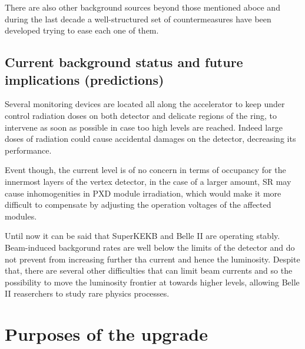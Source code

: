 There are also other  background sources beyond those mentioned aboce and during the last decade a well-structured set of countermeasures have been developed trying to ease each one of them.


\subsection{Current background status and future implications (predictions)}

Several monitoring devices are located all along the accelerator to keep under control radiation doses on both detector and delicate regions of the ring, to intervene as soon as possible in case too high levels are reached. Indeed large doses of radiation could cause accidental damages on the detector, decreasing its performance.

Event though, the current level is of no concern in terms of occupancy for the innermost layers of the vertex detector, in the case of a larger amount, SR may cause inhomogenities in PXD module irradiation, which would make it more difficult to compensate by adjusting the operation voltages of the affected modules.

Until now it can be said that SuperKEKB and Belle II are operating stably. Beam-induced backgorund rates are well below the limits of the detector and do not prevent from increasing further tha current and hence the luminosity.  
Despite that, there are several other difficulties that can limit beam currents and so the possibility to move the luminosity frontier at towards higher levels, allowing Belle II reaserchers to study rare physics processes. 



\section{Purposes of the upgrade}

